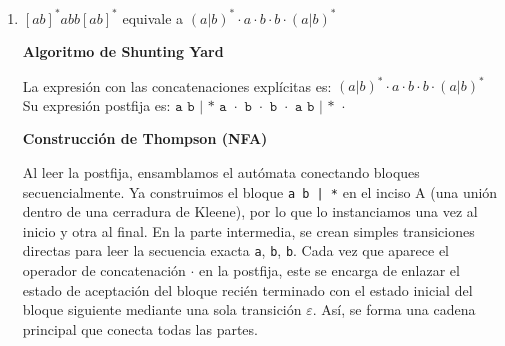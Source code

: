 \documentclass[12pt, letterpaper]{article}
\begin{document}
\begin{enumerate}
\begin{enumerate}
      Resumiendo los cálculos en su tabla de transiciones:
      \begin{center}
        \small
        \begin{tabular}{c|cc}
          \toprule
          \textbf{Estado DFA} & \textbf{Con $a$} & \textbf{Con $b$} \\
          \midrule
          $\rightarrow *A$ & $B$ & $C$ \\
          $*B$ & $B$ & $C$ \\
          $*C$ & $B$ & $C$ \\
          \bottomrule
        \end{tabular}
      \end{center}

      El DFA obtenido mediante la construcción de subconjuntos es:

      \begin{center}
      \end{center}


    \item $[ab]^*abb[ab]^*$ equivale a $(a|b)^*\cdot a\cdot b\cdot b\cdot(a|b)^*$

      \textbf{Algoritmo de Shunting Yard}

      La expresión con las concatenaciones explícitas es: $(a|b)^*\cdot a\cdot b\cdot b\cdot(a|b)^*$ \\
      Su expresión postfija es:
      $\boxed{\texttt{a b | * a $\cdot$ b $\cdot$ b $\cdot$ a b | * $\cdot$}}$

      \textbf{Construcción de Thompson (NFA)}

      Al leer la postfija, ensamblamos el autómata conectando bloques secuencialmente. Ya construimos el bloque \texttt{a b | *} en el inciso A (una unión dentro de una cerradura de Kleene), por lo que lo instanciamos una vez al inicio y otra al final. En la parte intermedia, se crean simples transiciones directas para leer la secuencia exacta \texttt{a}, \texttt{b}, \texttt{b}. Cada vez que aparece el operador de concatenación $\cdot$ en la postfija, este se encarga de enlazar el estado de aceptación del bloque recién terminado con el estado inicial del bloque siguiente mediante una sola transición $\varepsilon$. Así, se forma una cadena principal que conecta todas las partes.


\end{enumerate}
\end{enumerate}
\end{document}
